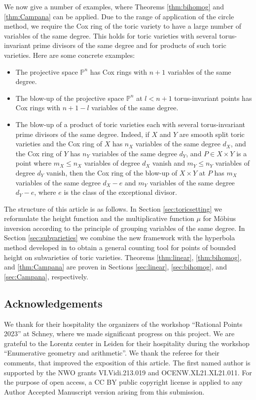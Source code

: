 \documentclass[10pt, a4paper, reqno, english]{amsart}
\newcommand\PP{\mathbb{P}} %
\theoremstyle{definition}
\numberwithin{theorem}{section}
\numberwithin{equation}{section}
\begin{document}
We now give a number of examples, where Theorems  \ref{thm:bihomog} and \ref{thm:Campana} can be applied. Due to the range of application of the circle method, we require the Cox ring of the toric variety to have a large number of variables of the same degree. 
This holds for toric varieties with several torus-invariant prime divisors of the same degree and for products of such toric varieties. Here are some concrete examples:
\begin{itemize}
\item The projective space $\PP^n$ has Cox rings with $n+1$ variables of the same degree.
\item The blow-up of  the projective space $\PP^n$ at $l< n+1$ torus-invariant points has Cox rings with $n+1-l$ variables of the same degree. 
\item 
The blow-up of a product of toric varieties each with several torus-invariant prime divisors of the same degree. Indeed, if $X$ and $Y$ are smooth split toric varieties and the Cox ring of $X$ has $n_X$ variables of the same degree $d_X$, and the Cox ring of $Y$ has $n_Y$ variables of the same degree $d_Y$, and $P\in X\times Y$ is a point where $m_X\leq n_X$ variables of degree $d_X$ vanish and $m_Y\leq n_Y$ variables of degree $d_Y$ vanish, then the Cox ring of the blow-up of $X\times Y$ at $P$ has $m_X$ variables of the same degree $d_X-e$ and $m_Y$ variables of the same degree $d_Y-e$, where $e$ is the class of the exceptional divisor.
\end{itemize}



The structure of this article is as follows. In Section \ref{sec:toricsetting} we reformulate the height function and the multiplicative function $\mu$ for M\"obius inversion according to the principle of grouping variables of the same degree. In Section \ref{sec:subvarieties} we combine the new framework with the hyperbola method developed in \cite{hypmethod} to obtain a general counting tool for points of bounded height on subvarieties of toric varieties. Theorems \ref{thm:linear}, \ref{thm:bihomog}, and \ref{thm:Campana} are proven in Sections \ref{sec:linear}, \ref{sec:bihomog}, and \ref{sec:Campana}, respectively.

\subsection*{Acknowledgements}
We thank for their hospitality  the organizers of the workshop ``Rational Points 2023'' at Schney, where we made significant progress on this project. We are grateful to the Lorentz center in Leiden for their hospitality during the workshop ``Enumerative geometry and arithmetic''. We thank the referee for their comments, that improved the exposition of this article.
The first named author is supported by the NWO grants VI.Vidi.213.019 and OCENW.XL21.XL21.011.
For the purpose of open access, a CC BY public copyright license is applied to any Author Accepted Manuscript version arising from this submission.
\end{document}
